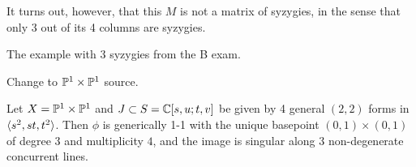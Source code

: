 \documentclass[fleqn,reqno]{amsart}
\begin{document}
\begin{example}[313]
\label{ex313}
It turns out, however, that this $M$ is not a matrix of syzygies,
in the sense that only 3 out of its 4 columns are syzygies.

The example with 3 syzygies from the B exam.
\end{example}

\begin{example}[318]
Change to $\mathbb{P}^1\times\mathbb{P}^1$ source.
\end{example}

\begin{example}[319]
\label{ex319}
Let $X=\mathbb{P}^1\times\mathbb{P}^1$ and $J\subset S=\mathbb{C}[s,u;t,v]$ be given by 4 general $(2,2)$ forms in $\langle s^2,st,t^2\rangle$.
Then $\phi$ is generically 1-1 with
the unique basepoint $(0,1)\times(0,1)$ of degree $3$ and multiplicity $4$,
and the image is singular along 3 non-degenerate concurrent lines.
\end{example}
\end{document}
